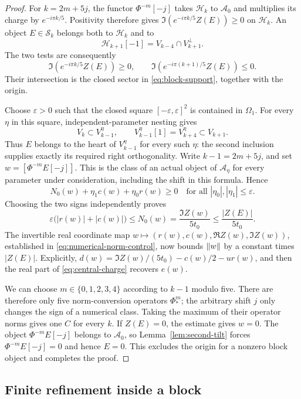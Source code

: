 \begin{proof}
For $k=2m+5j$, the functor $\Phi^{-m}[-j]$ takes $\mathcal H_k$ to
$\mathcal A_0$ and multiplies its charge by $e^{-i\pi k/5}$.  Positivity
therefore gives $\Im(e^{-i\pi k/5}Z(E))\ge0$ on $\mathcal H_k$.
An object $E\in\mathcal S_k$ belongs both to $\mathcal H_k$ and to
\[
 \mathcal H_{k+1}[-1]
   =V_{k-4}\cap V_{k+1}^\perp.
\]
The two tests are consequently
\[
 \Im(e^{-i\pi k/5}Z(E))\ge0,\qquad
 \Im(e^{-i\pi(k+1)/5}Z(E))\le0.
\]
Their intersection is the closed sector in \eqref{eq:block-support},
together with the origin.

Choose $\varepsilon>0$ such that the closed square
$[-\varepsilon,\varepsilon]^2$ is contained in $\Omega_1$.
For every $\eta$ in this square, independent-parameter nesting gives
\[
 V_k\subset V_{k-1}^\eta,
 \qquad V_{k-1}^\eta[1]=V_{k+4}^\eta\subset V_{k+1}.
\]
Thus $E$ belongs to the heart of $V_{k-1}^\eta$ for every such $\eta$:
the second inclusion supplies exactly its required right orthogonality.
Write $k-1=2m+5j$, and set $w=[\Phi^{-m}E[-j]]$.  This is the class of an
actual object of $\mathcal A_\eta$ for every parameter under consideration,
including the shift in this formula.  Hence
\[
 N_0(w)+\eta_1c(w)+\eta_0r(w)\ge0
 \quad\text{for all }|\eta_0|,|\eta_1|\le\varepsilon.
\]
Choosing the two signs independently proves
\begin{equation}\label{eq:perturbed-support}
 \varepsilon\bigl(|r(w)|+|c(w)|\bigr)
 \le N_0(w)=\frac{\Im Z(w)}{5t_0}
 \le\frac{|Z(E)|}{5t_0}.
\end{equation}
The invertible real coordinate map
$w\mapsto(r(w),c(w),\Re Z(w),\Im Z(w))$, established in
\eqref{eq:numerical-norm-control}, now bounds $\left\lVert w\right\rVert$ by a constant
times $|Z(E)|$.  Explicitly,
$d(w)=\Im Z(w)/(5t_0)-c(w)/2-ur(w)$, and then the real part of
\eqref{eq:central-charge} recovers $e(w)$.

We can choose $m\in\{0,1,2,3,4\}$ according to $k-1$ modulo five.
There are therefore only five norm-conversion operators $\Phi_*^m$;
the arbitrary shift $j$ only changes the sign of a numerical class.
Taking the maximum of their operator norms gives one $C$ for every $k$.
If $Z(E)=0$, the estimate gives $w=0$.  The object
$\Phi^{-m}E[-j]$ belongs to $\mathcal A_0$, so
Lemma~\ref{lem:second-tilt} forces $\Phi^{-m}E[-j]=0$ and hence $E=0$.
This excludes the origin for a nonzero block object and completes the proof.
\end{proof}

\subsection{Finite refinement inside a block}

